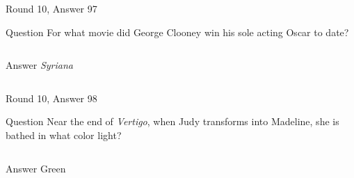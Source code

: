 \documentclass[11pt]{beamer}
\begin{document}
\begin{frame}[t]{Round 10, Answer 97}
  \vspace{2em}
  \begin{block}{Question}
    For what movie did George Clooney win his sole acting Oscar to date?
  \end{block}
  \pause{}
  \begin{columns}[T,totalwidth=\linewidth]
    \begin{column}{0.35\linewidth}
      \begin{block}{Answer}
        \emph{Syriana}
      \end{block}
    \end{column}
    \begin{column}{0.6\linewidth}
      \begin{center}
        \texttt{[image: \{Images/syriana]}.jpg}
      \end{center}
    \end{column}
  \end{columns}
\end{frame}


\begin{frame}[t]{Round 10, Answer 98}
  \vspace{2em}
  \begin{block}{Question}
    Near the end of \emph{Vertigo}, when Judy transforms into Madeline, she is bathed in what color light?
  \end{block}
  \pause{}
  \begin{columns}[T,totalwidth=\linewidth]
    \begin{column}{0.35\linewidth}
      \begin{block}{Answer}
        Green
      \end{block}
    \end{column}
    \begin{column}{0.6\linewidth}
      \begin{center}
        \texttt{[image: \{Images/vertigo-green]}.jpg}
      \end{center}
    \end{column}
  \end{columns}
\end{frame}
\end{document}
